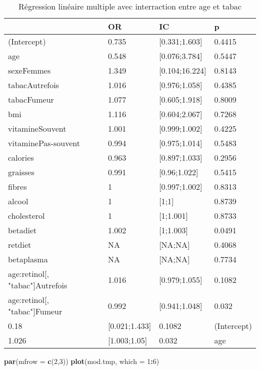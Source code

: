 \documentclass[]{article}
\newenvironment{Shaded}{\begin{snugshade}}{\end{snugshade}}
\newcommand{\KeywordTok}[1]{\textcolor[rgb]{0.13,0.29,0.53}{\textbf{#1}}}
\newcommand{\DataTypeTok}[1]{\textcolor[rgb]{0.13,0.29,0.53}{#1}}
\newcommand{\DecValTok}[1]{\textcolor[rgb]{0.00,0.00,0.81}{#1}}
\newcommand{\OperatorTok}[1]{\textcolor[rgb]{0.81,0.36,0.00}{\textbf{#1}}}
\newcommand{\NormalTok}[1]{#1}
\begin{document}
\begin{table}

\caption{\label{tab:unnamed-chunk-83}Régression linéaire multiple avec interraction entre age et tabac}
\centering
\begin{tabular}[t]{l|l|l|l}
\hline
  & OR & IC & p\\
\hline
\rowcolor[HTML]{BBD2E1}  (Intercept) & 0.735 & [0.331;1.603] & 0.4415\\
\hline
age & 0.548 & [0.076;3.784] & 0.5447\\
\hline
\rowcolor[HTML]{BBD2E1}  sexeFemmes & 1.349 & [0.104;16.224] & 0.8143\\
\hline
tabacAutrefois & 1.016 & [0.976;1.058] & 0.4385\\
\hline
\rowcolor[HTML]{BBD2E1}  tabacFumeur & 1.077 & [0.605;1.918] & 0.8009\\
\hline
bmi & 1.116 & [0.604;2.067] & 0.7268\\
\hline
\rowcolor[HTML]{BBD2E1}  vitamineSouvent & 1.001 & [0.999;1.002] & 0.4225\\
\hline
vitaminePas-souvent & 0.994 & [0.975;1.014] & 0.5483\\
\hline
\rowcolor[HTML]{BBD2E1}  calories & 0.963 & [0.897;1.033] & 0.2956\\
\hline
graisses & 0.991 & [0.96;1.022] & 0.5415\\
\hline
\rowcolor[HTML]{BBD2E1}  fibres & 1 & [0.997;1.002] & 0.8313\\
\hline
alcool & 1 & [1;1] & 0.8739\\
\hline
\rowcolor[HTML]{BBD2E1}  cholesterol & 1 & [1;1.001] & 0.8733\\
\hline
betadiet & 1.002 & [1;1.003] & 0.0491\\
\hline
\rowcolor[HTML]{BBD2E1}  retdiet & NA & [NA;NA] & 0.4068\\
\hline
betaplasma & NA & [NA;NA] & 0.7734\\
\hline
\rowcolor[HTML]{BBD2E1}  age:retinol[, "tabac"]Autrefois & 1.016 & [0.979;1.055] & 0.1082\\
\hline
age:retinol[, "tabac"]Fumeur & 0.992 & [0.941;1.048] & 0.032\\
\hline
\rowcolor[HTML]{BBD2E1}  0.18 & [0.021;1.433] & 0.1082 & (Intercept)\\
\hline
1.026 & [1.003;1.05] & 0.032 & age\\
\hline
\end{tabular}
\end{table}

\begin{Shaded}
\begin{Highlighting}[]
\KeywordTok{par}\NormalTok{(}\DataTypeTok{mfrow =} \KeywordTok{c}\NormalTok{(}\DecValTok{2}\NormalTok{,}\DecValTok{3}\NormalTok{))}
\KeywordTok{plot}\NormalTok{(mod.tmp, }\DataTypeTok{which =} \DecValTok{1}\OperatorTok{:}\DecValTok{6}\NormalTok{)}
\end{Highlighting}
\end{Shaded}
\end{document}
